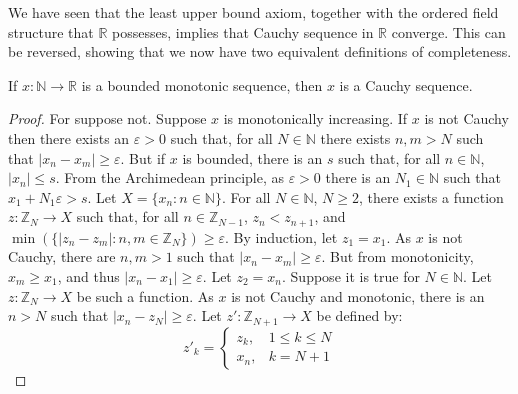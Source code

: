         We have seen that the least upper bound axiom,
        together with the ordered field structure that
        $\mathbb{R}$ possesses, implies that
        Cauchy sequence in $\mathbb{R}$ converge. This can
        be reversed, showing that we now have two equivalent
        definitions of completeness.
        \begin{theorem}
            If $x:\mathbb{N}\rightarrow\mathbb{R}$
            is a bounded monotonic sequence, then
            $x$ is a Cauchy sequence.
        \end{theorem}
        \begin{proof}
            For suppose not. Suppose $x$ is monotonically
            increasing. If $x$ is not Cauchy
            then there exists an $\varepsilon>0$ such
            that, for all $N\in\mathbb{N}$ there exists
            $n,m>N$ such that
            $|x_{n}-x_{m}|\geq\varepsilon$. But if
            $x$ is bounded, there is an $s$ such that,
            for all $n\in\mathbb{N}$, $|x_{n}|\leq{s}$.
            From the Archimedean principle, as
            $\varepsilon>0$ there is an $N_{1}\in\mathbb{N}$
            such that $x_{1}+N_{1}\varepsilon>s$.
            Let $X=\{x_{n}:n\in\mathbb{N}\}$.
            For all $N\in\mathbb{N}$, $N\geq{2}$,
            there exists a function
            $z:\mathbb{Z}_{N}\rightarrow{X}$ such that, for
            all $n\in\mathbb{Z}_{N-1}$,
            $z_{n}<z_{n+1}$, and
            $\min(\{|z_{n}-z_{m}|:n,m\in\mathbb{Z}_{N}\})%
             \geq\varepsilon$. By induction,
            let $z_{1}=x_{1}$. As $x$ is not Cauchy, there
            are $n,m>1$ such that
            $|x_{n}-x_{m}|\geq\varepsilon$. But from
            monotonicity, $x_{m}\geq{x}_{1}$, and thus
            $|x_{n}-x_{1}|\geq\varepsilon$.
            Let $z_{2}=x_{n}$. Suppose it is true for
            $N\in\mathbb{N}$. Let
            $z:\mathbb{Z}_{N}\rightarrow{X}$ be such a
            function. As $x$ is not Cauchy and
            monotonic, there is an $n>N$ such that
            $|x_{n}-z_{N}|\geq\varepsilon$.
            Let $z':\mathbb{Z}_{N+1}\rightarrow{X}$
            be defined by:
            \begin{subequations}
                \begin{equation}
                    z'_{k}=
                    \begin{cases}
                        z_{k},&1\leq{k}\leq{N}\\
                        x_{n},&k=N+1
                    \end{cases}

\end{equation}
\end{subequations}
\end{proof}
